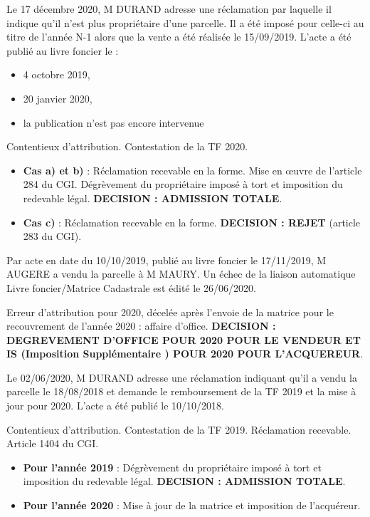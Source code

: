 \documentclass[a4paper, 12pt]{exam}
\begin{document}
\begin{questions}
	\question Le 17 décembre 2020, M DURAND adresse une réclamation par laquelle il indique qu'il n'est plus propriétaire d'une parcelle. Il a été imposé pour celle-ci au titre de l'année N-1 alors que la vente a été réalisée le 15/09/2019. L'acte a été publié au livre foncier le :
	\begin{itemize}
		\item 4 octobre 2019,
		\item 20 janvier 2020,
		\item la publication n'est pas encore intervenue
	\end{itemize}
	\begin{solution}
		Contentieux d'attribution. Contestation de la TF 2020.
		\begin{itemize}
			\item \textbf{Cas a) et b)} : Réclamation recevable en la forme. Mise en œuvre de l'article 284 du CGI. Dégrèvement du propriétaire imposé à tort et imposition du redevable légal. \textbf{DECISION : ADMISSION TOTALE}.
			\item \textbf{Cas c)} : Réclamation recevable en la forme. \textbf{DECISION : REJET} (article 283 du CGI).
		\end{itemize}
	\end{solution}
	
	\question Par acte en date du 10/10/2019, publié au livre foncier le 17/11/2019, M AUGERE a vendu la parcelle à M MAURY. Un échec de la liaison automatique Livre foncier/Matrice Cadastrale  est édité le 26/06/2020.
	\begin{solution}
		Erreur d'attribution pour 2020, décelée après l'envoie de la matrice pour le recouvrement de l'année 2020 : affaire d'office. 
		\textbf{DECISION : DEGREVEMENT D'OFFICE POUR 2020 POUR LE VENDEUR ET IS (Imposition Supplémentaire ) POUR 2020 POUR L'ACQUEREUR}.
	\end{solution}
	
	\question Le 02/06/2020, M DURAND adresse une réclamation indiquant qu'il a vendu la parcelle le 18/08/2018 et demande le remboursement de la TF 2019 et la mise à jour pour 2020. L'acte a été publié le 10/10/2018.
	\begin{solution}
		Contentieux d'attribution. Contestation de la TF 2019. Réclamation recevable. Article 1404 du CGI.
		\begin{itemize}
			\item \textbf{Pour l'année 2019} : Dégrèvement du propriétaire imposé à tort et imposition du redevable légal. \textbf{DECISION : ADMISSION TOTALE}.
			\item \textbf{Pour l'année 2020} : Mise à jour de la matrice et imposition de l'acquéreur. 
		\end{itemize}
	\end{solution}
\end{questions}
\end{document}
